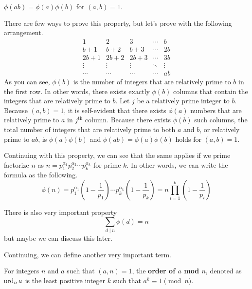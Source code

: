 \documentclass[../../main.tex]{subfiles}
\begin{document}
\begin{important}
$\phi(ab) = \phi(a) \phi(b)$ for $(a, b) = 1$.
\end{important}

There are few ways to prove this property, but let's prove with
the following arrangement.
\[
\begin{array}{ccccc}
    1      & 2      & 3      & \cdots & b  \\
    b + 1  & b + 2  & b + 3  & \cdots & 2b \\
    2b + 1 & 2b + 2 & 2b + 3 & \cdots & 3b \\
    \vdots & \vdots & \vdots & \ddots & \vdots \\
    \cdots & \cdots & \cdots & \cdots & ab
\end{array}
\]
As you can see, $\phi(b)$ is the number of integers that are
relatively prime to $b$ in the first row. In other words,
there exists exactly $\phi(b)$ columns that contain the integers
that are relatively prime to $b$. Let $j$ be a relatively prime
integer to $b$. Because $(a, b) = 1$, it is self-evident that
there exists $\phi(a)$ numbers that are relatively prime to $a$
in $j^\text{th}$ column. Because there exists $\phi(b)$ such columns,
the total number of integers that are relatively prime to both
$a$ and $b$, or relatively prime to $ab$, is $\phi(a) \phi(b)$ and
$\phi(ab) = \phi(a) \phi(b)$ holds for $(a, b) = 1$.

\begin{important}
Continuing with this property, we can see that the same applies
if we prime factorize $n$ as $n = p_1^{\alpha_1} p_2^{\alpha_2}
\cdots p_k^{\alpha_k}$ for prime $k$. In other words, we can write
the formula as the following.
\[
\phi(n)
= p_1^{\alpha_1} \left( 1 - \frac{1}{p_1} \right)
    \cdots
    p_k^{\alpha_k} \left( 1 - \frac{1}{p_k} \right)
= n \prod_{i=1}^k \left( 1 - \frac{1}{p_i} \right)
\]
\end{important}

There is also very important property
\[
\sum_{d \mid n} \phi(d) = n
\]
but maybe we can discuss this later.

Continuing, we can define another very important term.

\begin{definition}{}{}
For integers $n$ and $a$ such that $(a, n) = 1$,
the \textbf{order of $a$ mod $n$}, denoted as $\operatorname{ord}_n a$ is
the least positive integer $k$ such that $a^k \equiv 1 \pmod{n}$.
\end{definition}
\end{document}
